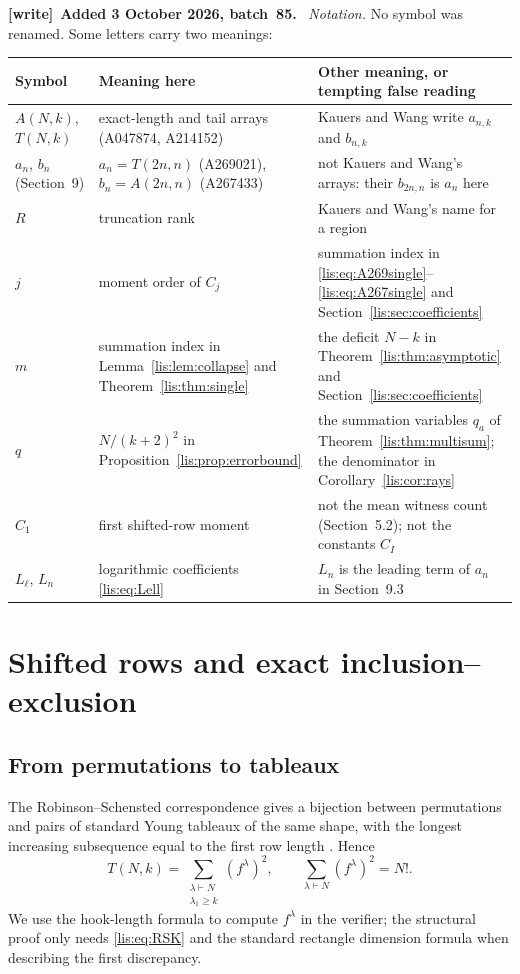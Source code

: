 \documentclass[11pt,letterpaper]{article}
\numberwithin{equation}{section}
\theoremstyle{definition}
\newenvironment{writenote}[1][]{\par\smallskip\begingroup\small
 \noindent\textbf{[write]}\if\relax\detokenize{#1}\relax\else~\textbf{#1.}\fi\ }%
 {\par\endgroup\smallskip}
\begin{document}
\begin{writenote}[Added 3 October 2026, batch~85]
\emph{Notation.} No symbol was renamed. Some letters carry two meanings:
\begin{center}\footnotesize
\begin{tabular}{@{}>{\raggedright\arraybackslash}p{}>{\raggedright\arraybackslash}p{}>{\raggedright\arraybackslash}p{}@{}}
\toprule
Symbol & Meaning here & Other meaning, or tempting false reading\\
\midrule
$A(N,k)$, $T(N,k)$ & exact-length and tail arrays (A047874, A214152) &
Kauers and Wang write $a_{n,k}$ and $b_{n,k}$\\
$a_n$, $b_n$ (Section~9) & $a_n=T(2n,n)$ (A269021), $b_n=A(2n,n)$
(A267433) & not Kauers and Wang's arrays: their $b_{2n,n}$ is $a_n$ here\\
$R$ & truncation rank & Kauers and Wang's name for a region\\
$j$ & moment order of $C_j$ & summation index in
\eqref{lis:eq:A269single}--\eqref{lis:eq:A267single} and Section~\ref{lis:sec:coefficients}\\
$m$ & summation index in Lemma~\ref{lis:lem:collapse} and
Theorem~\ref{lis:thm:single} & the deficit $N-k$ in
Theorem~\ref{lis:thm:asymptotic} and Section~\ref{lis:sec:coefficients}\\
$q$ & $N/(k+2)^2$ in Proposition~\ref{lis:prop:errorbound} & the
summation variables $q_a$ of Theorem~\ref{lis:thm:multisum}; the
denominator in Corollary~\ref{lis:cor:rays}\\
$C_1$ & first shifted-row moment & not the mean witness count
(Section~5.2); not the constants $C_I$\\
$L_\ell$, $L_n$ & logarithmic coefficients \eqref{lis:eq:Lell} &
$L_n$ is the leading term of $a_n$ in Section~9.3\\
\bottomrule
\end{tabular}
\end{center}
\end{writenote}

\section{Shifted rows and exact inclusion--exclusion}
\subsection{From permutations to tableaux}
The Robinson--Schensted correspondence gives a bijection between
permutations and pairs of standard Young tableaux of the same shape,
with the longest increasing subsequence equal to the first row length
\cite{Schensted}. Hence
\begin{equation}
 T(N,k)=\sum_{\substack{\lambda\vdash N\\\lambda_1\ge k}}
                    (f^\lambda)^2,
 \qquad \sum_{\lambda\vdash N}(f^\lambda)^2=N!.
 \label{lis:eq:RSK}
\end{equation}
We use the hook-length formula to compute $f^\lambda$ in the verifier;
the structural proof only needs \eqref{lis:eq:RSK} and the standard rectangle
dimension formula when describing the first discrepancy.
\end{document}

